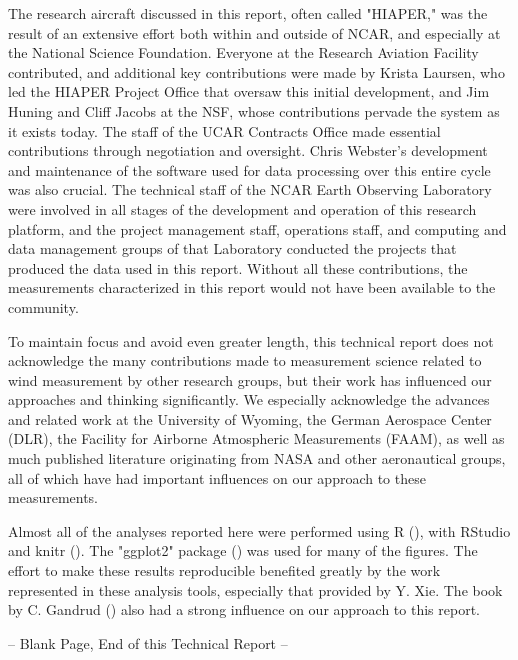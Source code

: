\documentclass[12pt,twoside,english]{article}\usepackage[]{graphicx}\usepackage[]{color}
\begin{document}
The research aircraft discussed in this report, often called "HIAPER," was the result of an extensive effort both within and outside of NCAR, and especially at the National Science Foundation. Everyone at the Research Aviation Facility contributed, and additional key contributions were made by Krista Laursen, who led the HIAPER Project Office that oversaw this initial development, and Jim Huning and Cliff Jacobs at the NSF, whose contributions pervade the system as it exists today. The staff of the UCAR Contracts Office made essential contributions through negotiation and oversight. Chris Webster's development and maintenance of the software used for data processing over this entire cycle was also crucial. The technical staff of the NCAR Earth Observing Laboratory were involved in all stages of the development and operation of this research platform, and the project management staff, operations staff, and computing and data management groups of that Laboratory conducted the projects that produced the data used in this report. Without all these contributions, the measurements characterized in this report would not have been available to the community.

To maintain focus and avoid even greater length, this technical report does not acknowledge the many contributions made to measurement science related to wind measurement by other research groups, but their work has influenced our approaches and thinking significantly. We especially acknowledge the advances and related work at the University of Wyoming, the German Aerospace Center (DLR), the Facility for Airborne Atmospheric Measurements (FAAM), as well as much published literature originating from NASA and other aeronautical groups, all of which have had important influences on our approach to these measurements.

Almost all of the analyses reported here were performed using R (\citet{Rlanguage}), with RStudio  \citet{RStudio2012} and knitr (\citet{Xie2014a,Xie2014b}). The
"ggplot2" package (\citet{wickham2009}) was used for many of the figures. The effort to make these results reproducible benefited greatly by the work represented in these analysis tools, especially that provided by Y. Xie. The book by C. Gandrud (\citet{Gandrud2014}) also had a strong influence on our approach to this report.


\label{sec:bibliography}
\clearpage
{}
{}

\clearpage
{}
{}
\printindex[lis]{}
\clearpage
{}
{}
\printindex[var]{}
\clearpage
{}
{}
\printindex[idx]{}

\clearpage

\centerline{-- Blank Page, End of this Technical Report --}
\vfill\eject
\clearpage
{}
\end{document}
